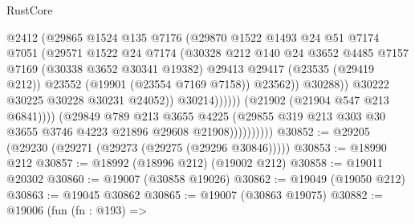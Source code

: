 \begin{lexlean}{RustCore}
\begin{coremodule}
                                        @2412
                                        (@29865
                                          @1524
                                          @135
                                          @7176
                                          (@29870
                                            @1522
                                            @1493
                                            @24
                                            @51
                                            @7174
                                            @7051
                                            (@29571
                                              @1522
                                              @24
                                              @7174
                                              (@30328
                                                @212
                                                @140
                                                @24
                                                @3652
                                                @4485
                                                @7157
                                                @7169
                                                (@30338 @3652 @30341 @19382)
                                                @29413
                                                @29417
                                                (@23535 (@29419 @212))
                                                @23552
                                                (@19901 (@23554 @7169 @7158))
                                                @23562))
                                            @30288))
                                        @30222
                                        @30225
                                        @30228
                                        @30231
                                        @24052))
                                    @30214))))))
                        (@21902 (@21904 @547 @213 @6841))))
                    (@29849
                      @789
                      @213
                      @3655
                      @4225
                      (@29855 @319 @213 @303 @30 @3655 @3746 @4223 @21896 @29608 @21908))))))))))
@30852 := @29205 (@29230 (@29271 (@29273 (@29275 (@29296 @30846)))))
@30853 := @18990 @212
@30857 := @18992 (@18996 @212) (@19002 @212)
@30858 := @19011 @20302
@30860 := @19007 (@30858 @19026)
@30862 := @19049 (@19050 @212)
@30863 := @19045 @30862
@30865 := @19007 (@30863 @19075)
@30882 := @19006
    (fun (fn : @193) =>

\end{coremodule}
\end{lexlean}

